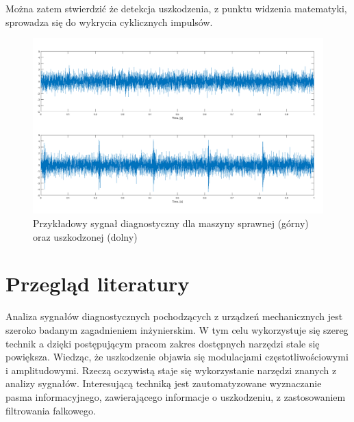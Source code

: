 \documentclass[inzynierska]{pwr_wmat_praca_dyplomowa}
\theoremstyle{plain}
\numberwithin{theorem}{chapter}
\theoremstyle{definition}
\numberwithin{theorem}{chapter}
\begin{document}
Można zatem stwierdzić że detekcja uszkodzenia, z punktu widzenia matematyki, sprowadza się do wykrycia cyklicznych impulsów. 
\begin{figure}[ht]
	\centering
	\includegraphics[scale=0.35]{images/zdrowy_pulsacja.png}
	\caption{Przykładowy sygnał diagnostyczny dla maszyny sprawnej (górny) oraz uszkodzonej (dolny)}
	\label{sygnal}
\end{figure}



\section{Przegląd literatury}
Analiza sygnałów diagnostycznych pochodzących z urządzeń mechanicznych jest szeroko badanym zagadnieniem inżynierskim. W tym celu wykorzystuje się szereg technik a dzięki postępującym pracom zakres dostępnych narzędzi stale się powiększa. Wiedząc, że uszkodzenie objawia się modulacjami częstotliwościowymi i amplitudowymi. Rzeczą oczywistą staje się wykorzystanie narzędzi znanych z analizy sygnałów.
Interesującą techniką jest zautomatyzowane wyznaczanie pasma informacyjnego, zawierającego informacje o uszkodzeniu, z zastosowaniem filtrowania falkowego\cite{linandzuo}. 
\end{document}
